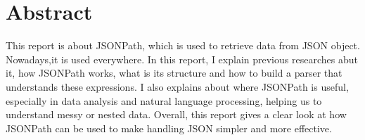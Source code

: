 \chapter*{Abstract}
This report is about JSONPath, which is used to retrieve data from JSON object. Nowadays,it is used everywhere. In this report, I explain previous researches abut it, how JSONPath works, what is its structure and how to build a parser that understands these expressions. I also explains about where JSONPath is useful, especially in data analysis and natural language processing, helping us to understand messy or nested data. Overall, this report gives a clear look at how JSONPath can be used to make handling JSON simpler and more effective.
